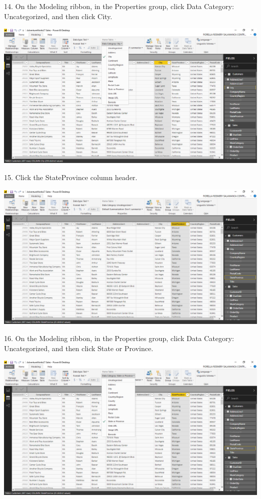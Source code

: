 14. On the Modeling ribbon, in the Properties group, click Data Category: Uncategorized, and then click City.\\

	\begin{center}
	\includegraphics[width=17cm]{./Imagenes/Ejercicio1/Tarea3/12}
	\end{center}	

15. Click the StateProvince column header.\\

	\begin{center}
	\includegraphics[width=17cm]{./Imagenes/Ejercicio1/Tarea3/13}
	\end{center}	

16. On the Modeling ribbon, in the Properties group, click Data Category: Uncategorized, and then click State or Province.\\

	\begin{center}
	\includegraphics[width=17cm]{./Imagenes/Ejercicio1/Tarea3/14}
	\end{center}	

